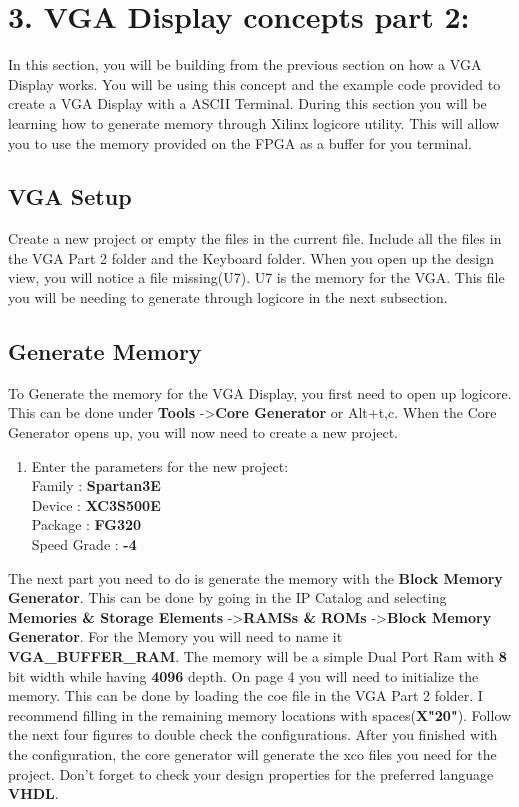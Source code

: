 \documentclass{article}
\begin{document}
\newpage

\section{3. VGA Display concepts part 2:}
In this section, you will be building from the previous section on how a VGA Display works. You will be using this concept and the example code provided to create a VGA Display with a ASCII Terminal. During this section you will be learning how to generate memory through Xilinx\textsuperscript{\textregistered} logicore utility. This will allow you to use the memory provided on the FPGA as a buffer for you terminal.

\subsection{VGA Setup}
Create a new project or empty the files in the current file. Include all the files in the VGA Part 2 folder and the Keyboard folder. When you open up the design view, you will notice a file missing(U7). U7 is the memory for the VGA. This file you will be needing to generate through logicore in the next subsection.

\subsection{Generate Memory}
To Generate the memory for the VGA Display, you first need to open up logicore. This can be done under \textbf{Tools} -\textgreater \textbf{Core Generator} or Alt+t,c. When the Core Generator opens up, you will now need to create a new project.

\begin{enumerate}
  \item Enter the parameters for the new project: \hfill \\
  Family : \textbf{Spartan3E}\\
  Device : \textbf{XC3S500E}\\
  Package : \textbf{FG320}\\
  Speed Grade : \textbf{-4}\\
\end{enumerate}

The next part you need to do is generate the memory with the \textbf{Block Memory Generator}. This can be done by going in the IP Catalog and selecting \textbf{Memories \& Storage Elements} -\textgreater \textbf{RAMSs \& ROMs} -\textgreater \textbf{Block Memory Generator}. For the Memory you will need to name it \textbf{VGA\_BUFFER\_RAM}. The memory will be a simple Dual Port Ram with \textbf{8} bit width while having \textbf{4096} depth. On page 4 you will need to initialize the memory. This can be done by loading the coe file in the VGA Part 2 folder. I recommend filling in the remaining memory locations with spaces(\textbf{X"20"}). Follow the next four figures to double check the configurations. After you finished with the configuration, the core generator will generate the xco files you need for the project. Don't forget to check your design properties for the preferred language \textbf{VHDL}. 
\end{document}
